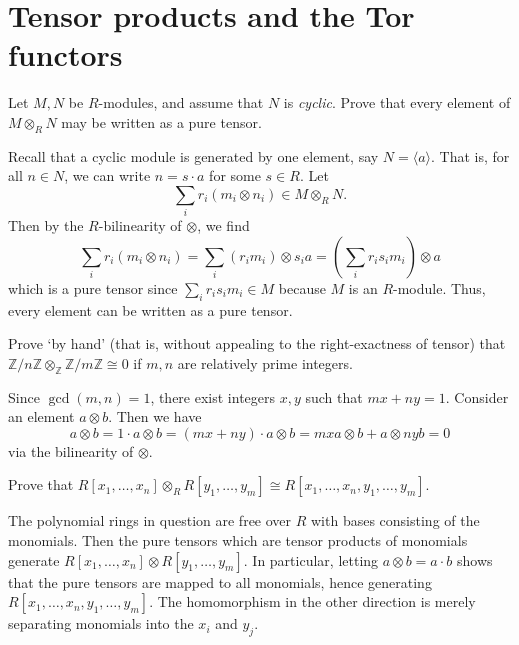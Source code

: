 \documentclass[../../master.tex]{subfiles}
\begin{document}
\section{Tensor products and the Tor functors}

\begin{problem}
    Let $M, N$ be $R$-modules, and assume that $N$ is \textit{cyclic}.
    Prove that every element of $M \otimes_R N$ may be written as a pure tensor.
\end{problem}

\begin{solution}
    Recall that a cyclic module is generated by one element, say $N = \langle a \rangle$.
    That is, for all $n \in N$, we can write $n = s \cdot a$ for some $s \in R$.
    Let
    \[
        \sum_{i} r_i(m_i \otimes n_i) \in M \otimes_R N.
    \]
    Then by the $R$-bilinearity of $\otimes$, we find
    \[
        \sum_{i} r_i (m_i \otimes n_i) = \sum_{i} (r_i m_i) \otimes s_i a = \left( \sum_{i} r_i s_i m_i \right) \otimes a
    \]
    which is a pure tensor since $\sum_{i} r_i s_i m_i \in M$ because $M$ is an $R$-module.
    Thus, every element can be written as a pure tensor.
\end{solution}

\begin{problem}
    Prove `by hand' (that is, without appealing to the right-exactness of tensor) that $\mathbb{Z} / n\mathbb{Z} \otimes_{\mathbb{Z}} \mathbb{Z}/m\mathbb{Z} \cong 0$ if $m, n$ are relatively prime integers.
\end{problem}

\begin{solution}
    Since $\gcd(m, n) = 1$, there exist integers $x, y$ such that $mx + ny = 1$.
    Consider an element $a \otimes b$.
    Then we have
    \[
        a \otimes b = 1 \cdot a \otimes b = (mx + ny) \cdot a \otimes b = mx a \otimes b + a \otimes ny b = 0
    \]
    via the bilinearity of $\otimes$.
\end{solution}

\begin{problem}
    Prove that $R[x_1, \ldots, x_n] \otimes_R R[y_1, \ldots, y_m] \cong R[x_1, \ldots, x_n, y_1, \ldots, y_m]$.
\end{problem}

\begin{solution}
    The polynomial rings in question are free over $R$ with bases consisting of the monomials.
    Then the pure tensors which are tensor products of monomials generate $R[x_1, \ldots, x_n] \otimes R[y_1, \ldots, y_m]$.
    In particular, letting $a \otimes b = a \cdot b$ shows that the pure tensors are mapped to all monomials, hence generating $R[x_1, \ldots, x_n, y_1, \ldots, y_m]$.
    The homomorphism in the other direction is merely separating monomials into the $x_i$ and $y_j$.
\end{solution}
\end{document}
